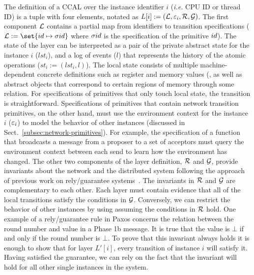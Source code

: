 The definition of a  CCAL over the instance identifier $i$ (\textit{i.e.} CPU ID or thread ID)
is a tuple with four elements, notated as $L[i] := (\mathcal{L}, \varepsilon_i, \mathcal{R}, \mathcal{G})$.
The first component $\mathcal{L}$ contains a partial map from
identifiers to transition specifications
($\layerdef := \set{\primid \mapsto \primspec{\primid}}$ where $ {\sigma}{id}$ is
the specification of the primitive $id$).
The state of the layer can be interpreted as a pair
of the private abstract state for the instance $i$ ($lst_i$), and
a log of events ($l$) that represents the history of the atomic operations ($st_i := (lst_i, l)$).
The local state consists of multiple machine-dependent concrete definitions such as register and memory values (,
as well as abstract objects that correspond to
certain regions of memory through some relation.
For specifications of primitives that only touch local state, the transition is straightforward.
Specifications of primitives that contain network transition primitives, on the other hand,
must use the environment context for the instance $i$ ($\varepsilon_i$)
to model the behavior of other instances (discussed in Sect.~\ref{subsec:network-primitives}).
For example, the specification of a function that broadcasts a message from a proposer to a set of acceptors must query the environment context
between each send to learn how the environment has changed.
The other two components of the layer definition, $\mathcal{R}$ and $\mathcal{G}$,
provide invariants about the network and the distributed system
following the approach of previous work on rely/guarantee systems~\cite{RGSim, LRG}.
The invariants in $\mathcal{R}$ and $\mathcal{G}$ are complementary to each other.
Each layer must contain evidence that all of the local transitions satisfy the conditions in $\mathcal{G}$.
Conversely, we can restrict the behavior of other instances by using assuming the conditions in $\mathcal{R}$ hold.
One example of a rely/guarantee rule in Paxos concerns the relation between the round number and value in a Phase 1b message.
It is true that the value is $\bot$ if and only if the round number is $\bot$.
To prove that this invariant always holds it is enough to show that
for layer $L'[i]$, every transition of instance $i$ will satisfy it.
Having satisfied the guarantee, we can rely on the fact that the invariant will hold for all other single instances in the system.



